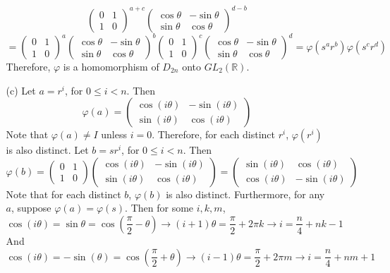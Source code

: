 \documentclass[12pt]{article}
\begin{document}
\begin{itemize}
\begin{itemize}
$$\begin{pmatrix}
0 & 1 \\
1 & 0
\end{pmatrix}^{a+c}\begin{pmatrix}
\cos\theta & -\sin\theta \\
\sin\theta & \cos\theta
\end{pmatrix}^{d-b}$$
$$= \begin{pmatrix}
0 & 1 \\
1 & 0
\end{pmatrix}^a\begin{pmatrix}
\cos\theta & -\sin\theta \\
\sin\theta & \cos\theta
\end{pmatrix}^b\begin{pmatrix}
0 & 1 \\
1 & 0
\end{pmatrix}^c\begin{pmatrix}
\cos\theta & -\sin\theta \\
\sin\theta & \cos\theta
\end{pmatrix}^d = \varphi(s^ar^b)\varphi(s^cr^d)$$
Therefore, $\varphi$ is a homomorphism of $D_{2n}$ onto $GL_2(\mathbb{R})$.
\item[(c)]
Let $a = r^i$, for $0 \leq i < n$. Then
$$\varphi(a) = \begin{pmatrix}
\cos(i\theta) & -\sin(i\theta) \\
\sin(i\theta) & \cos(i\theta)
\end{pmatrix}$$
Note that $\varphi(a) \neq I$ unless $i = 0$. Therefore, for each distinct $r^i$, $\varphi(r^i)$ is also distinct. Let $b = sr^i$, for $0 \leq i < n$. Then
$$\varphi(b) = \begin{pmatrix}
0 & 1 \\
1 & 0
\end{pmatrix}\begin{pmatrix}
\cos(i\theta) & -\sin(i\theta) \\
\sin(i\theta) & \cos(i\theta)
\end{pmatrix} = \begin{pmatrix}
\sin(i\theta) & \cos(i\theta) \\
\cos(i\theta) & -\sin(i\theta)
\end{pmatrix}$$
Note that for each distinct $b$, $\varphi(b)$ is also distinct. Furthermore, for any $a$, suppose $\varphi(a) = \varphi(s)$. Then for some $i, k, m$,
$$\cos(i\theta) = \sin\theta = \cos(\frac{\pi}{2} - \theta) \rightarrow (i + 1)\theta = \frac{\pi}{2} + 2\pi k \rightarrow i = \frac{n}{4} + nk - 1$$
And
$$\cos(i\theta) = -\sin(\theta) = \cos(\frac{\pi}{2} + \theta) \rightarrow (i - 1)\theta = \frac{\pi}{2} +2\pi m \rightarrow i = \frac{n}{4} + nm + 1$$

\end{itemize}
\end{itemize}
\end{document}
